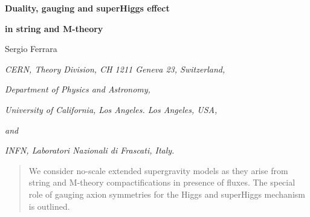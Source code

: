 \documentclass[a4paper,12pt]{article}
\begin{document}


\newcommand{\R}{\mathbb{R}}
\newcommand{\C}{\mathbb{C}}
\newcommand{\Z}{\mathbb{Z}}
\newcommand{\Hb}{\mathbb{H}}

\newcommand{\rE}{\mathrm{E}}
\newcommand{\rSp}{\mathrm{Sp}}
\newcommand{\rSO}{\mathrm{SO}}
\newcommand{\rSL}{\mathrm{SL}}
\newcommand{\rSU}{\mathrm{SU}}
\newcommand{\rUSp}{\mathrm{USp}}
\newcommand{\rU}{\mathrm{U}}
\newcommand{\rF}{\mathrm{F}}
\newcommand{\rGL}{\mathrm{GL}}
\newcommand{\rG}{\mathrm{G}}
\newcommand{\rK}{\mathrm{K}}


\newcommand{\fgl}{\mathfrak{gl}}
\newcommand{\fu}{\mathfrak{u}}
\newcommand{\fsl}{\mathfrak{sl}}
\newcommand{\fsp}{\mathfrak{sp}}
\newcommand{\fusp}{\mathfrak{usp}}
\newcommand{\fsu}{\mathfrak{su}}
\newcommand{\fp}{\mathfrak{p}}
\newcommand{\fso}{\mathfrak{so}}
\newcommand{\fl}{\mathfrak{l}}
\newcommand{\fg}{\mathfrak{g}}
\newcommand{\fr}{\mathfrak{r}}
\newcommand{\fe}{\mathfrak{e}}
\newcommand{\ft}{\mathfrak{t}}





\newcommand{\id}{\relax{\rm 1\kern-.35em 1}}
\vskip 1.5cm


  \centerline{\LARGE \bf Duality, gauging and superHiggs effect}
  
  \bigskip
  
  \centerline{\LARGE\bf in string and M-theory }





 \vskip 3cm
 \centerline{\large Sergio Ferrara}

\vskip 1.5cm



\centerline{\it CERN, Theory Division, CH 1211 Geneva 23,
Switzerland, }

\medskip

\centerline{\it Department of Physics and Astronomy,} \centerline{\it University of California,
Los Angeles. Los Angeles, USA, } 

\smallskip
\centerline{\it and} 

\smallskip

\centerline{\it  INFN, Laboratori Nazionali di
Frascati, Italy.}





\vskip 1cm

\begin{abstract}
We consider no-scale extended supergravity models as they arise from string and M-theory compactifications
 in presence of fluxes. The special role of gauging axion symmetries for the Higgs and superHiggs mechanism is 
outlined.
\end{abstract}
\end{document}
